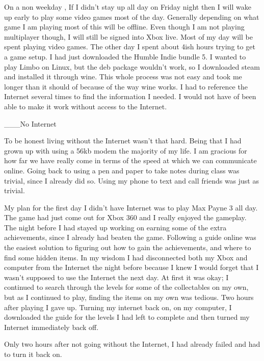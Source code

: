 \documentclass[12pt,letterpaper]{article}
\begin{document}
On a non weekday , If I didn't stay up all day on Friday night then I
will wake up early to play some video games most of the day. Generally
depending on what game I am playing most of this will be offline. Even
though I am not playing multiplayer though, I will still be signed into
Xbox live. Most of my day will be spent playing video games. The other
day I spent about 4ish hours trying to get a game setup. I had just
downloaded the Humble Indie bundle 5. I wanted to play Limbo on Linux,
but the deb package wouldn't work, so I downloaded steam and installed
it through wine. This whole process was not easy and took me longer than
it should of because of the way wine works. I had to reference the
Internet several times to find the information I needed. I would not
have of been able to make it work without access to the Internet.






___No Internet

To be honest living without the Internet wasn't that hard. Being that I
had grown up with using a 56kb modem the majority of my life. I am
gracious for how far we have really come in terms of the speed at which
we can communicate online. Going back to using a pen and paper to take
notes during class was trivial, since I already did so. Using my phone
to text and call friends was just as trivial.

My plan for the first day I didn't have Internet was to play Max Payne 3
all day. The game had just come out for Xbox 360 and I really enjoyed
the gameplay. The night before I had stayed up working on earning some
of the extra achievements, since I already had beaten the game.
Following a guide online was the easiest solution to figuring out how to
gain the achievements, and where to find some hidden items. In my wisdom
I had disconnected both my Xbox and computer from the Internet the night
before because I knew I would forget that I wasn't supposed to use the
Internet the next day. At first it was okay; I continued to search
through the levels for some of the collectables on my own, but as I 
continued to play, finding the items on my own was tedious. Two hours
after playing I gave up. Turning my internet back on, on my computer, I
downloaded the guide for the levels I had left to complete and then
turned my Internet immediately back off. 

Only two hours after not going without the Internet, I had already
failed and had to turn it back on.
\end{document}
